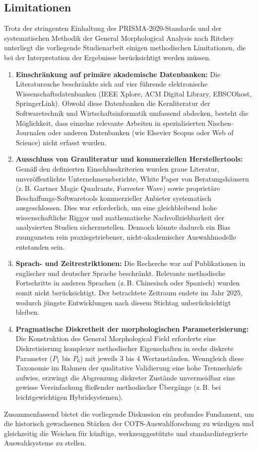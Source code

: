 \subsection{Limitationen}
\label{subsec:limitationen}

Trotz der stringenten Einhaltung des PRISMA-2020-Standards \cite{BP42WGEK} und der systematischen Methodik der General Morphological Analysis nach Ritchey \cite{Z6N6V5L9} unterliegt die vorliegende Studienarbeit einigen methodischen Limitationen, die bei der Interpretation der Ergebnisse berücksichtigt werden müssen.

\begin{enumerate}
    \item \textbf{Einschränkung auf primäre akademische Datenbanken:} Die Literatursuche beschränkte sich auf vier führende elektronische Wissenschaftsdatenbanken (IEEE Xplore, ACM Digital Library, EBSCOhost, SpringerLink). Obwohl diese Datenbanken die Kernliteratur der Softwaretechnik und Wirtschaftsinformatik umfassend abdecken, besteht die Möglichkeit, dass einzelne relevante Arbeiten in spezialisierten Nischen-Journalen oder anderen Datenbanken (wie Elsevier Scopus oder Web of Science) nicht erfasst wurden.

    \item \textbf{Ausschluss von Grauliteratur und kommerziellen Herstellertools:} Gemäß den definierten Einschlusskriterien wurden graue Literatur, unveröffentlichte Unternehmensberichte, White Paper von Beratungshäusern (z.\,B. Gartner Magic Quadrants, Forrester Wave) sowie proprietäre Beschaffungs-Softwaretools kommerzieller Anbieter systematisch ausgeschlossen. Dies war erforderlich, um eine gleichbleibend hohe wissenschaftliche Riggor und mathematische Nachvollziehbarkeit der analysierten Studien sicherzustellen. Dennoch könnte dadurch ein Bias zuungunsten rein praxisgetriebener, nicht-akademischer Auswahlmodelle entstanden sein.

    \item \textbf{Sprach- und Zeitrestriktionen:} Die Recherche war auf Publikationen in englischer und deutscher Sprache beschränkt. Relevante methodische Fortschritte in anderen Sprachen (z.\,B. Chinesisch oder Spanisch) wurden somit nicht berücksichtigt. Der betrachtete Zeitraum endete im Jahr 2025, wodurch jüngste Entwicklungen nach diesem Stichtag unberücksichtigt bleiben.

    \item \textbf{Pragmatische Diskretheit der morphologischen Parameterisierung:} Die Konstruktion des General Morphological Field erforderte eine Diskretisierung komplexer methodischer Eigenschaften in sechs diskrete Parameter ($P_1$ bis $P_6$) mit jeweils 3 bis 4 Wertzuständen. Wenngleich diese Taxonomie im Rahmen der qualitative Validierung eine hohe Trennschärfe aufwies, erzwingt die Abgrenzung diskreter Zustände unvermeidbar eine gewisse Vereinfachung fließender methodischer Übergänge (z.\,B. bei leichtgewichtigen Hybridsystemen).
\end{enumerate}

Zusammenfassend bietet die vorliegende Diskussion ein profundes Fundament, um die historisch gewachsenen Stärken der COTS-Auswahlforschung zu würdigen und gleichzeitig die Weichen für künftige, werkzeuggestützte und standardintegrierte Auswahlsysteme zu stellen.
